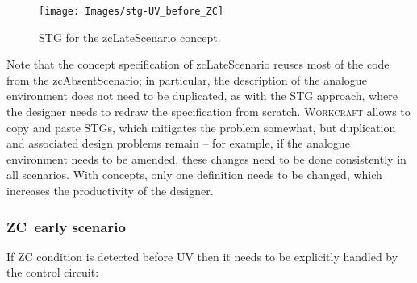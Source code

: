 \documentclass[british, journal]{IEEEtran}
\newcommand{\noun}[1]{\textsc{#1}}
\begin{document}
\begin{figure}[H]
\begin{centering}
\vspace{-1mm}
\texttt{[image: Images/stg-UV\_before\_ZC]}
\par\end{centering}
\vspace{-1mm}
\protect\caption{\label{fig:zcLateScenario STG}STG for the \textsf{zcLateScenario} concept.}
\vspace{-3mm}
\end{figure}

Note that the concept specification of \textsf{zcLateScenario} reuses most of
the code from the \textsf{zcAbsentScenario}; in particular, the description of
the analogue environment does not need to be duplicated, as with the STG
approach, where the designer needs to redraw the specification from scratch.
\noun{Workcraft} allows to copy and paste STGs, which mitigates the problem
somewhat, but duplication and associated design problems remain -- for example, if
the analogue environment needs to be amended, these changes need to be done
consistently in all scenarios. With concepts, only one definition needs to be
changed, which increases the productivity of the designer.

\subsubsection{ZC~early scenario}

If ZC condition is detected before UV then it needs to be explicitly
handled by the control circuit:
\end{document}
